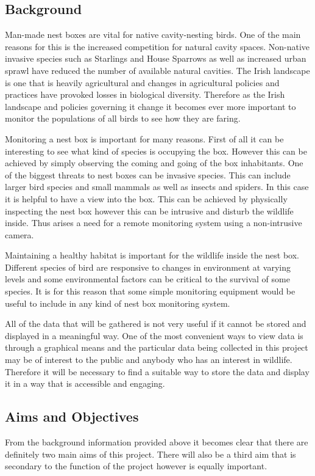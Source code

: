 \documentclass[10pt,a4paper]{article}
\begin{document}
\subsection{Background}
Man-made nest boxes are vital for native cavity-nesting birds. One of the main reasons for this is the increased competition for natural cavity spaces. Non-native invasive species such as Starlings and House Sparrows as well as increased urban sprawl have reduced the number of available natural cavities. The Irish landscape is one that is heavily agricultural and changes in agricultural policies and practices have provoked losses in biological diversity\cite{PIERRET201814}. Therefore as the Irish landscape and policies governing it change it becomes ever more important to monitor the populations of all birds to see how they are faring\cite{website:birdwatchireland}. 

Monitoring a nest box is important for many reasons. First of all it can be interesting to see what kind of species is occupying the box. However this can be achieved by simply observing the coming and going of the box inhabitants. One of the biggest threats to nest boxes can be invasive species. This can include larger bird species and small mammals as well as insects and spiders. In this case it is helpful to have a view into the box. This can be achieved by physically inspecting the nest box however this can be intrusive and disturb the wildlife inside. Thus arises a need for a remote monitoring system using a non-intrusive camera. 

Maintaining a healthy habitat is important for the wildlife inside the nest box. Different species of bird are responsive to changes in environment at varying levels and some environmental factors can be critical to the survival of some species\cite{wormworth06}. It is for this reason that some simple monitoring equipment would be useful to include in any kind of nest box monitoring system.

All of the data that will be gathered is not very useful if it cannot be stored and displayed in a meaningful way. One of the most convenient ways to view data is through a graphical means and the particular data being collected in this project may be of interest to the public and anybody who has an interest in wildlife. Therefore it will be necessary to find a suitable way to store the data and display it in a way that is accessible and engaging. 

\subsection{Aims and Objectives}
From the background information provided above it becomes clear that there are definitely two main aims of this project. There will also be a third aim that is secondary to the function of the project however is equally important. 
\end{document}
